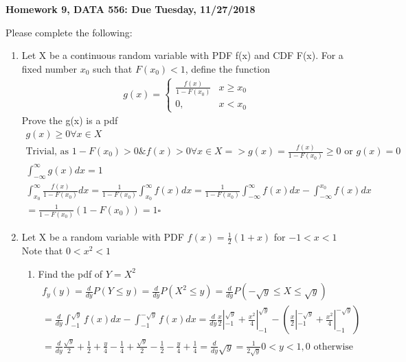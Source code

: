 \documentclass[11pt]{article}
\begin{document}
\begin{title}
	{\Large\bf Homework 9, DATA 556: Due Tuesday, 11/27/2018}
\end{title}

\author{\bf Alexander Van Roijen}

\maketitle

\newpage
Please complete the following:
\begin{enumerate}
\item Let X be a continuous random variable with PDF f(x) and CDF F(x). For a fixed number $x_0$ such that $F(x_0) < 1$, define the function
	\begin{gather}
	g(x) = 
	\begin{cases}
		\frac{f(x)}{1-F(x_0)} & x \ge x_0\\
		0 , & x < x_0
	\end{cases}
	\end{gather}
Prove the g(x) is a pdf
\begin{gather}
	g(x)\ge 0 \forall x \in X \\
	\text{Trivial, as } 1-F(x_0) > 0 \& f(x)>0 \forall x \in X => g(x)=\frac{f(x)}{1-F(x_0)} \ge 0 \text{ or } g(x) = 0\\
	\int_{-\infty}^{\infty}g(x)dx = 1\\
	\int_{x_0}^{\infty}\frac{f(x)}{1-F(x_0)}dx = \frac{1}{1-F(x_0)}\int_{x_0}^{\infty}f(x)dx = \frac{1}{1-F(x_0)}\int_{-\infty}^{\infty}f(x)dx - \int_{-\infty}^{x_0}f(x)dx\\
	=\frac{1}{1-F(x_0)} (1 - F(x_0)) = 1 \square
\end{gather}
\item Let X be a random variable with PDF $f(x) = \frac{1}{2}(1+x)$ for $-1<x<1$\\
Note that $0<x^2<1$
\begin{enumerate}
	\item Find the pdf of $Y=X^2$
	\begin{gather}
	f_y(y)= \frac{d}{dy} P(Y\le y) = \frac{d}{dy} P(X^2\le y) = \frac{d}{dy} P(-\sqrt{y} \le X \le \sqrt{y}) \\
	= 	\frac{d}{dy} \int_{-1}^{\sqrt{y}} f(x)dx - \int_{-1}^{-\sqrt{y}} f(x)dx = \frac{d}{dy} \frac{x}{2}|_{-1}^{\sqrt{y}} + \frac{x^2}{4}|_{-1}^{\sqrt{y}} - (\frac{x}{2}|_{-1}^{-\sqrt{y}} + \frac{x^2}{4}|_{-1}^{-\sqrt{y}})\\
	=\frac{d}{dy} \frac{\sqrt{y}}{2} + \frac{1}{2} + \frac{y}{4} - \frac{1}{4} + \frac{\sqrt{y}}{2} - \frac{1}{2} -\frac{y}{4}+\frac{1}{4} = \frac{d}{dy} \sqrt{y} = \frac{1}{2\sqrt{y}} 0<y<1, 0 \text{ otherwise}

\end{gather}
\end{enumerate}
\end{enumerate}
\end{document}
